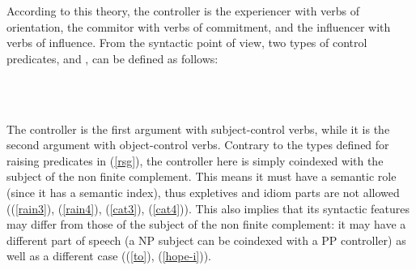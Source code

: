 \documentclass[output=paper
	        ,collection
	        ,collectionchapter
 	        ,biblatex
                ,babelshorthands
                ,newtxmath
                ,draftmode
                ,colorlinks, citecolor=brown
]{langscibook}
\begin{document}
\eas
\zs
\eas 
\zs

According to this theory, the controller is the experiencer with verbs of orientation, the commitor with verbs of commitment, and the influencer with verbs of influence. 
From the syntactic point of view, two types of control predicates,  and  , can be defined as follows:

\eal
\label{cont}
\ex
\label{subj-cont-lx}
 \impl\\
\ex
{} \impl\\ 
\zl

The controller is the first argument with subject-control verbs, while it is the second argument with object-control verbs. Contrary to the types defined for raising predicates in (\ref{rsg}), the controller here is simply coindexed with the subject of the non finite complement. This means it must have a semantic role (since it has a semantic index), thus expletives and idiom parts are not allowed ((\ref{rain3}), (\ref{rain4}), (\ref{cat3}), (\ref{cat4})). This also implies that its syntactic features may differ from those of the subject of the non finite complement: it may have a different part of speech (a NP subject can be coindexed with a PP controller) as well as a different case ((\ref{to}), (\ref{hope-i})).
\end{document}
